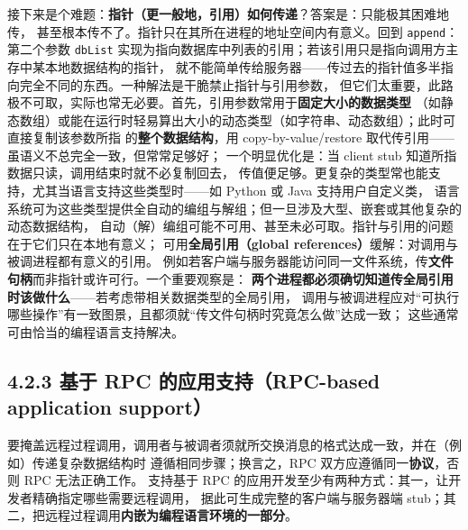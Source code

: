 \medskip\noindent 接下来是个难题：\textbf{指针（更一般地，引用）如何传递}？答案是：只能极其困难地传，
甚至根本传不了。指针只在其所在进程的地址空间内有意义。回到 \texttt{append}：第二个参数
\texttt{dbList} 实现为指向数据库中列表的引用；若该引用只是指向调用方主存中某本地数据结构的指针，
就不能简单传给服务器——传过去的指针值多半指向完全不同的东西。一种解法是干脆禁止指针与引用参数，
但它们太重要，此路极不可取，实际也常无必要。首先，引用参数常用于\textbf{固定大小的数据类型}
（如静态数组）或能在运行时轻易算出大小的动态类型（如字符串、动态数组）；此时可直接复制该参数所指
的\textbf{整个数据结构}，用 copy-by-value/restore 取代传引用——虽语义不总完全一致，但常常足够好；
一个明显优化是：当 client stub 知道所指数据只读，调用结束时就不必复制回去，
传值便足够。更复杂的类型常也能支持，尤其当语言支持这些类型时——如 Python 或 Java 支持用户自定义类，
语言系统可为这些类型提供全自动的编组与解组；但一旦涉及大型、嵌套或其他复杂的动态数据结构，
自动（解）编组可能不可用、甚至未必可取。指针与引用的问题在于它们只在本地有意义；
可用\textbf{全局引用（global references）}缓解：对调用与被调进程都有意义的引用。
例如若客户端与服务器能访问同一文件系统，传\textbf{文件句柄}而非指针或许可行。一个重要观察是：
\textbf{两个进程都必须确切知道传全局引用时该做什么}——若考虑带相关数据类型的全局引用，
调用与被调进程应对“可执行哪些操作”有一致图景，且都须就“传文件句柄时究竟怎么做”达成一致；
这些通常可由恰当的编程语言支持解决。

\begin{closeread}
\end{closeread}


\subsection*{4.2.3 基于 RPC 的应用支持（RPC-based application support）}
要掩盖远程过程调用，调用者与被调者须就所交换消息的格式达成一致，并在（例如）传递复杂数据结构时
遵循相同步骤；换言之，RPC 双方应遵循同一\textbf{协议}，否则 RPC 无法正确工作。
支持基于 RPC 的应用开发至少有两种方式：其一，让开发者精确指定哪些需要远程调用，
据此可生成完整的客户端与服务器端 stub；其二，把远程过程调用\textbf{内嵌为编程语言环境的一部分}。

